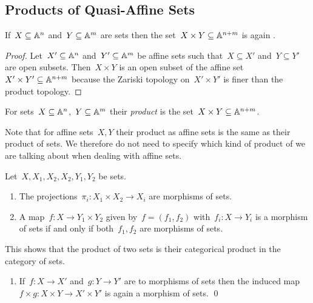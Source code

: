 \subsection{Products of Quasi-Affine Sets}


\begin{lemma}
  If~$X \subseteq \mathbb{A}^n$ and~$Y \subseteq \mathbb{A}^m$ are {\qaffine} sets then the set~$X \times Y \subseteq \mathbb{A}^{n+m}$ is again {\qaffine}.
\end{lemma}


\begin{proof}
  Let~$X' \subseteq \mathbb{A}^n$ and~$Y' \subseteq \mathbb{A}^m$ be affine sets such that~$X \subseteq X'$ and~$Y \subseteq Y'$ are open subsets.
  Then~$X \times Y$ is an open subset of the affine set~$X' \times Y' \subseteq \mathbb{A}^{n+m}$ because the Zariski topology on~$X' \times Y'$ is finer than the product topology.
\end{proof}



\begin{definition}
  For {\qaffine} sets~$X \subseteq \mathbb{A}^n$,~$Y \subseteq \mathbb{A}^m$ their \emph{product} is the {\qaffine} set~$X \times Y \subseteq \mathbb{A}^{n+m}$.
\end{definition}


\begin{fluff}
  Note that for affine sets~$X, Y$ their product as affine sets is the same as their product of {\qaffine} sets.
  We therefore do not need to specify which kind of product of we are talking about when dealing with affine sets.
\end{fluff}


\begin{lemma}
  Let~$X, X_1, X_2, X_2, Y_1, Y_2$ be {\qaffine} sets.
  \begin{enumerate}
    \item
      The projections~$\pi_i \colon X_1 \times X_2 \to X_i$ are morphisms of {\qaffine} sets.
    \item
      A map~$f \colon X \to Y_1 \times Y_2$ given by~$f = (f_1, f_2)$ with~$f_i \colon X \to Y_i$ is a morphism of {\qaffine} sets if and only if both~$f_1, f_2$ are morphisms of {\qaffine} sets.
  \end{enumerate}
  This shows that the product of two {\qaffine} sets is their categorical product in the category of {\qaffine} sets.
  \begin{enumerate}[resume]
    \item
      If~$f \colon X \to X'$ and~$g \colon Y \to Y'$ are to morphisms of {\qaffine} sets then the induced map~$f \times g \colon X \times Y \to X' \times Y'$ is again a morphism of {\qaffine} sets.
    \qed
  \end{enumerate}
\end{lemma}





